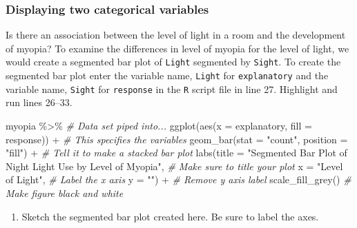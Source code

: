 \documentclass[
]{report}
\newenvironment{Shaded}{\begin{snugshade}}{\end{snugshade}}
\newcommand{\AttributeTok}[1]{\textcolor[rgb]{0.77,0.63,0.00}{#1}}
\newcommand{\CommentTok}[1]{\textcolor[rgb]{0.56,0.35,0.01}{\textit{#1}}}
\newcommand{\FunctionTok}[1]{\textcolor[rgb]{0.00,0.00,0.00}{#1}}
\newcommand{\NormalTok}[1]{#1}
\newcommand{\SpecialCharTok}[1]{\textcolor[rgb]{0.00,0.00,0.00}{#1}}
\newcommand{\StringTok}[1]{\textcolor[rgb]{0.31,0.60,0.02}{#1}}
\providecommand{\tightlist}{%
  \setlength{\itemsep}{0pt}\setlength{\parskip}{0pt}}
\begin{document}
\newpage

\hypertarget{displaying-two-categorical-variables}{%
\subsubsection*{Displaying two categorical variables}\label{displaying-two-categorical-variables}}

Is there an association between the level of light in a room and the development of myopia? To examine the differences in level of myopia for the level of light, we would create a segmented bar plot of \texttt{Light} segmented by \texttt{Sight}. To create the segmented bar plot enter the variable name, \texttt{Light} for \texttt{explanatory} and the variable name, \texttt{Sight} for \texttt{response} in the \texttt{R} script file in line 27. Highlight and run lines 26--33.

\begin{Shaded}
\begin{Highlighting}[]
\NormalTok{myopia }\SpecialCharTok{\%\textgreater{}\%} \CommentTok{\# Data set piped into...}
\FunctionTok{ggplot}\NormalTok{(}\FunctionTok{aes}\NormalTok{(}\AttributeTok{x =}\NormalTok{ explanatory, }\AttributeTok{fill =}\NormalTok{ response)) }\SpecialCharTok{+}   \CommentTok{\# This specifies the variables}
  \FunctionTok{geom\_bar}\NormalTok{(}\AttributeTok{stat =} \StringTok{"count"}\NormalTok{, }\AttributeTok{position =} \StringTok{"fill"}\NormalTok{) }\SpecialCharTok{+}  \CommentTok{\# Tell it to make a stacked bar plot}
  \FunctionTok{labs}\NormalTok{(}\AttributeTok{title =} \StringTok{"Segmented Bar Plot of Night Light Use by Level of Myopia"}\NormalTok{,  }
       \CommentTok{\# Make sure to title your plot }
       \AttributeTok{x =} \StringTok{"Level of Light"}\NormalTok{,   }\CommentTok{\# Label the x axis}
       \AttributeTok{y =} \StringTok{""}\NormalTok{) }\SpecialCharTok{+}  \CommentTok{\# Remove y axis label}
    \FunctionTok{scale\_fill\_grey}\NormalTok{()  }\CommentTok{\# Make figure black and white}
\end{Highlighting}
\end{Shaded}

\begin{enumerate}
\def\labelenumi{\arabic{enumi}.}
\setcounter{enumi}{4}
\tightlist
\item
  Sketch the segmented bar plot created here. Be sure to label the axes.
\end{enumerate}
\end{document}
